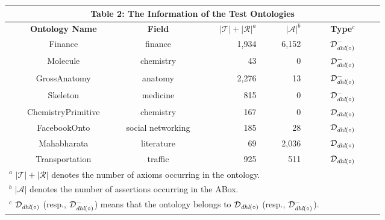 \documentclass[final,1p,times]{elsarticle}
\begin{document}
\begin{center}
\begin{tabular}{ccrrc}
\multicolumn{5}{c}{\textbf{Table 2: The Information of the Test Ontologies}}\\
\hline
~~~~~\textbf{Ontology Name}~~~~~&~~~~~\textbf{Field}~~~~~&~~~~~$|\mathcal{T}|+|\mathcal{R}|^a$&~~~~~$|\mathcal{A}|^b$&~~~~~\textbf{Type}$^c$~~~~~\\
\hline

Finance&finance&1,934&6,152&$\mathcal{D}^-_{\textit{\text{dhl}}(\circ)}$\\

Molecule&chemistry&43&0&$\mathcal{D}^-_{\textit{\text{dhl}}(\circ)}$\\

GrossAnatomy&anatomy&2,276&13&$\mathcal{D}^-_{\textit{\text{dhl}}(\circ)}$\\

Skeleton&medicine&815&0&$\mathcal{D}^-_{\textit{\text{dhl}}(\circ)}$\\

\hline

ChemistryPrimitive&chemistry&167&0&$\mathcal{D}_{\textit{\text{dhl}}(\circ)}$\\

FacebookOnto&social networking&185&28&$\mathcal{D}_{\textit{\text{dhl}}(\circ)}$\\

Mahabharata&literature&69&2,036&$\mathcal{D}_{\textit{\text{dhl}}(\circ)}$\\

Transportation&traffic&925&511&$\mathcal{D}_{\textit{\text{dhl}}(\circ)}$\\

\hline
\multicolumn{5}{l}{$^a$ \footnotesize$|\mathcal{T}|+|\mathcal{R}|$ denotes the number of axioms occurring in the ontology.}\\

\multicolumn{5}{l}{$^b$ \footnotesize$|\mathcal{A}|$ denotes the number of assertions occurring in the ABox.}\\

\multicolumn{5}{l}{$^c$ \footnotesize$\mathcal{D}_{\textit{\text{dhl}}(\circ)}$ (resp., $\mathcal{D}^-_{\textit{\text{dhl}}(\circ)}$)
means that the ontology belongs to $\mathcal{D}_{\textit{\text{dhl}}(\circ)}$ (resp., $\mathcal{D}^-_{\textit{\text{dhl}}(\circ)}$).}\\
\end{tabular}
\label{tab:info}
\end{center}
\end{document}
